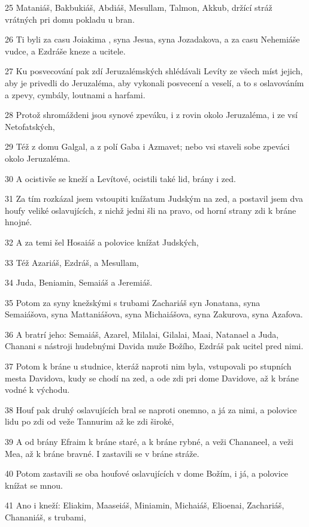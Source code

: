 \par 25 Mataniáš, Bakbukiáš, Abdiáš, Mesullam, Talmon, Akkub, držící stráž vrátných pri domu pokladu u bran.
\par 26 Ti byli za casu Joiakima , syna Jesua, syna Jozadakova, a za casu Nehemiáše vudce, a Ezdráše kneze a ucitele.
\par 27 Ku posvecování pak zdí Jeruzalémských shlédávali Levíty ze všech míst jejich, aby je privedli do Jeruzaléma, aby vykonali posvecení a veselí, a to s oslavováním a zpevy, cymbály, loutnami a harfami.
\par 28 Protož shromáždeni jsou synové zpeváku, i z rovin okolo Jeruzaléma, i ze vsí Netofatských,
\par 29 Též z domu Galgal, a z polí Gaba i Azmavet; nebo vsi staveli sobe zpeváci okolo Jeruzaléma.
\par 30 A ocistivše se kneží a Levítové, ocistili také lid, brány i zed.
\par 31 Za tím rozkázal jsem vstoupiti knížatum Judským na zed, a postavil jsem dva houfy veliké oslavujících, z nichž jedni šli na pravo, od horní strany zdi k bráne hnojné.
\par 32 A za temi šel Hosaiáš a polovice knížat Judských,
\par 33 Též Azariáš, Ezdráš, a Mesullam,
\par 34 Juda, Beniamin, Semaiáš a Jeremiáš.
\par 35 Potom za syny knežskými s trubami Zachariáš syn Jonatana, syna Semaiášova, syna Mattaniášova, syna Michaiášova, syna Zakurova, syna Azafova.
\par 36 A bratrí jeho: Semaiáš, Azarel, Milalai, Gilalai, Maai, Natanael a Juda, Chanani s nástroji hudebnými Davida muže Božího, Ezdráš pak ucitel pred nimi.
\par 37 Potom k bráne u studnice, kteráž naproti nim byla, vstupovali po stupních mesta Davidova, kudy se chodí na zed, a ode zdi pri dome Davidove, až k bráne vodné k východu.
\par 38 Houf pak druhý oslavujících bral se naproti onemno, a já za nimi, a polovice lidu po zdi od veže Tannurim až ke zdi široké,
\par 39 A od brány Efraim k bráne staré, a k bráne rybné, a veži Chananeel, a veži Mea, až k bráne bravné. I zastavili se v bráne stráže.
\par 40 Potom zastavili se oba houfové oslavujících v dome Božím, i já, a polovice knížat se mnou.
\par 41 Ano i kneží: Eliakim, Maaseiáš, Miniamin, Michaiáš, Elioenai, Zachariáš, Chananiáš, s trubami,
